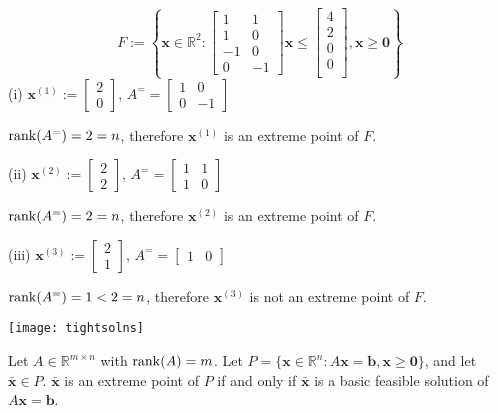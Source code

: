 \[ F:=\left\{ \bm{x}\in\mathbb{R}^2: \begin{bmatrix}
        1  & 1  \\
        1  & 0  \\
        -1 & 0  \\
        0  & -1
    \end{bmatrix}\bm{x}\le
    \begin{bmatrix}
        4 \\
        2 \\
        0 \\
        0 \\
    \end{bmatrix}, \bm{x}\geqslant  \bm{0} \right\} \]
(i)
$\bm{x}^{(1)}:=\begin{bmatrix}2\\0\end{bmatrix}$,
$ A^= =
    \begin{bmatrix}
        1 & 0  \\
        0 & -1
    \end{bmatrix} $

$ \operatorname{rank}(A^=)=2=n $, therefore $\bm{x}^{(1)}$ is an extreme
point of $ F $.

(ii)
$\bm{x}^{(2)}:=\begin{bmatrix}2\\2\end{bmatrix}$,
$ A^= =
    \begin{bmatrix}
        1 & 1 \\
        1 & 0
    \end{bmatrix} $

$ \operatorname{rank}(A^=)=2=n $, therefore $\bm{x}^{(2)}$ is an extreme
point of $ F $.

(iii)
$\bm{x}^{(3)}:=\begin{bmatrix}2\\1\end{bmatrix}$,
$ A^= =
    \begin{bmatrix}
        1 & 0
    \end{bmatrix} $

$ \operatorname{rank}(A^=)=1<2=n $, therefore $\bm{x}^{(3)}$ is not an extreme
point of $ F $.

\begin{center}
    \texttt{[image: tightsolns]}
\end{center}

\begin{thmbox}
    \begin{theorem}
        Let $ A\in\mathbb{R}^{m\times n} $ with $ \operatorname{rank}(A)=m $.
        Let $ P=\{\bm{x}\in\mathbb{R}^n: A \bm{x}=\bm{b},
            \bm{x}\geqslant  \bm{0}\} $, and let $ \bm{\bar{x}}\in P $.
        $ \bm{\bar{x}} $ is an extreme point of $ P $ if and only if $ \bm{\bar{x}} $ is a basic feasible
        solution of $  A \bm{x}=\bm{b} $.
    \end{theorem}
\end{thmbox}


